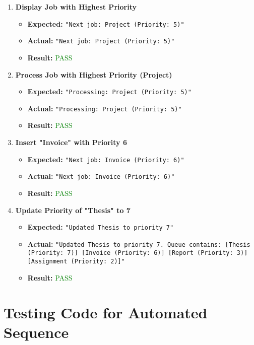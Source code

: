 \documentclass{article}
\begin{document}
\begin{enumerate}
    \item \textbf{Display Job with Highest Priority}
        \begin{itemize}
            \item \textbf{Expected:} \texttt{"Next job: Project (Priority: 5)"}
            \item \textbf{Actual:} \texttt{"Next job: Project (Priority: 5)"}
            \item \textbf{Result:} \textcolor{green}{PASS}
        \end{itemize}

    \item \textbf{Process Job with Highest Priority (Project)}
        \begin{itemize}
            \item \textbf{Expected:} \texttt{"Processing: Project (Priority: 5)"}
            \item \textbf{Actual:} \texttt{"Processing: Project (Priority: 5)"}
            \item \textbf{Result:} \textcolor{green}{PASS}
        \end{itemize}

    \item \textbf{Insert "Invoice" with Priority 6}
        \begin{itemize}
            \item \textbf{Expected:} \texttt{"Next job: Invoice (Priority: 6)"}
            \item \textbf{Actual:} \texttt{"Next job: Invoice (Priority: 6)"}
            \item \textbf{Result:} \textcolor{green}{PASS}
        \end{itemize}

    \item \textbf{Update Priority of "Thesis" to 7}
        \begin{itemize}
            \item \textbf{Expected:} \texttt{"Updated Thesis to priority 7"}
            \item \textbf{Actual:} \texttt{"Updated Thesis to priority 7. Queue contains: [Thesis (Priority: 7)] [Invoice (Priority: 6)] [Report (Priority: 3)] [Assignment (Priority: 2)]"}
            \item \textbf{Result:} \textcolor{green}{PASS}
        \end{itemize}
\end{enumerate}


\section*{Testing Code for Automated Sequence}
\end{document}
